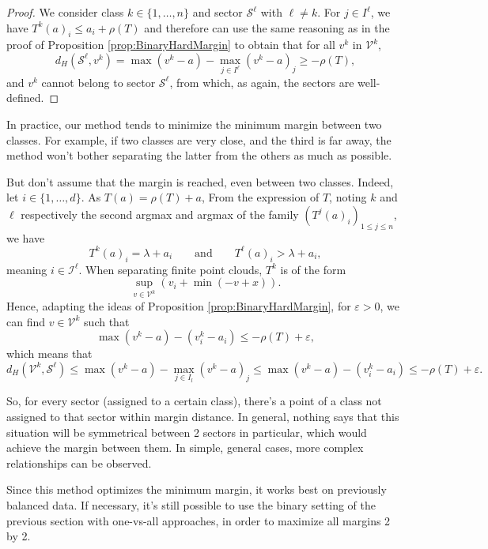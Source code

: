 \documentclass[oneside,UKenglish,a4paper]{amsart}
\numberwithin{equation}{section}
\numberwithin{figure}{section}
\theoremstyle{plain}
\theoremstyle{definition}
\theoremstyle{plain}
\theoremstyle{remark}
\theoremstyle{plain}
\theoremstyle{definition}
\theoremstyle{definition}
\begin{document}
\begin{proof}
We consider class $k\in\{1,\ldots, n\}$ and sector $\mathcal{S}^\ell$ with $\ell \ne k$. For $j \in I^{\ell}$, we have $T^{k}(a)_i\le a_i + \rho(T)$ and therefore can use the same reasoning
as in the proof of Proposition \ref{prop:BinaryHardMargin} to obtain that for all $v^{k}$ in $\mathcal{V}^{k}$,
\[
d_H(\mathcal{S}^\ell,v^{k})=\max(v^{k}-a)-\max_{j\in I^{\ell}}(v^{k}-a)_j\ge-\rho(T),
\]
and $v^k$ cannot belong to sector $\mathcal{S}^\ell$, from which, as again, the sectors are well-defined.
\end{proof}

In practice, our method tends to minimize the minimum margin between two classes. For example, if two classes are very close, and the third is far away, the method won't bother separating the latter from the others as much as possible.

But don't assume that the margin is reached, even between two classes. Indeed, let $i\in\{1,\ldots, d\}$. As $T(a)=\rho(T)+a$, 
From the expression of $T$, noting $k$ and $\ell$ respectively the second argmax and argmax of the family $\left(T^{j}(a)_{i}\right)_{1\le j\le n}$, we have
\[
T^{k}(a)_{i} =\lambda+a_{i}\qquad \text{and}\qquad T^{\ell}(a)_{i} >\lambda+a_{i},
\] %
meaning $i\in \mathcal{I}^{\ell}$. When separating finite point clouds, $T^k$
is of the form
\[
\sup_{v\in\mathcal{V}^{k}}\left(v_{i}+\min(-v+x)\right).
\]
Hence, adapting the ideas of Proposition \ref{prop:BinaryHardMargin}, for $\varepsilon > 0$, we can find $v\in \mathcal{V}^k$ such that $$\max(v^{k}-a)-(v_{i}^{k}-a_{i})\le-\rho(T)+\varepsilon,$$ which means that 
\[
d_H\left(\mathcal{V}^{k}, \mathcal{S}^\ell \right)\le \max(v^{k}-a)-\max_{j\in I_l}(v^{k}-a)_j \le \max(v^{k}-a) - (v^{k}_i - a_i) \le -\rho(T)+\varepsilon.
\]

So, for every sector (assigned to a certain class), there's a point of a class not assigned to that sector within margin distance. In general, nothing says that this situation will be symmetrical between 2 sectors in particular, which would achieve the margin between them. In simple, general cases, more complex relationships can be observed.

Since this method optimizes the minimum margin, it works best on previously balanced data. If necessary, it's still possible to use the binary setting of the previous section with one-vs-all approaches, in order to maximize all margins 2 by 2.
\end{document}
